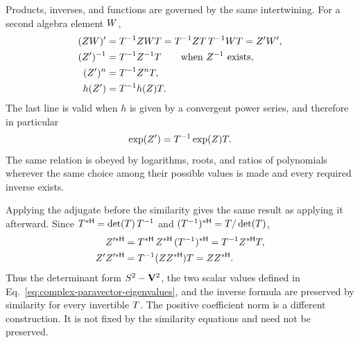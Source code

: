 Products, inverses, and functions are governed by the same intertwining. For a
second algebra element \(W\),
\begin{align}
(\pv{Z}\pv{W})'&=\pv{T}^{-1}\pv{Z}\pv{W}\pv{T}
=\pv{T}^{-1}\pv{Z}\pv{T}\,\pv{T}^{-1}\pv{W}\pv{T}=\pv{Z}'\pv{W}',\notag\\
(\pv{Z}')^{-1}&=\pv{T}^{-1}\pv{Z}^{-1}\pv{T}
\qquad\text{when }\pv{Z}^{-1}\text{ exists},\notag\\
(\pv{Z}')^n&=\pv{T}^{-1}\pv{Z}^n\pv{T},\notag\\
h(\pv{Z}')&=\pv{T}^{-1}h(\pv{Z})\pv{T}.
\label{eq:similarity-covariance}
\end{align}
The last line is valid when \(h\) is given by a convergent power series, and
therefore in particular
\begin{equation*}
\exp(Z')=T^{-1}\exp(Z)T.
\end{equation*}
The same relation is obeyed by logarithms, roots, and ratios of polynomials
wherever the same choice among their possible values is made and every
required inverse exists.

Applying the adjugate before the similarity gives the same result as
applying it afterward. Since
\(T^{*\mathsf H}=\operatorname{det}\!\left(T\right)T^{-1}\) and
\((T^{-1})^{*\mathsf H}=T/\operatorname{det}\!\left(T\right)\),
\begin{align*}
Z'^{*\mathsf H}
&=T^{*\mathsf H}\,Z^{*\mathsf H}\,(T^{-1})^{*\mathsf H}
=T^{-1}Z^{*\mathsf H}T,\\
Z'Z'^{*\mathsf H}
&=T^{-1}(ZZ^{*\mathsf H})T=ZZ^{*\mathsf H}.
\end{align*}
Thus the determinant form \(S^2-\mathbf{V}^2\), the two scalar values defined
in Eq.\ \eqref{eq:complex-paravector-eigenvalues}, and the inverse formula
are preserved by similarity for every invertible \(T\). The positive
coefficient norm is a different construction. It is not fixed by the
similarity equations and need not be preserved.

